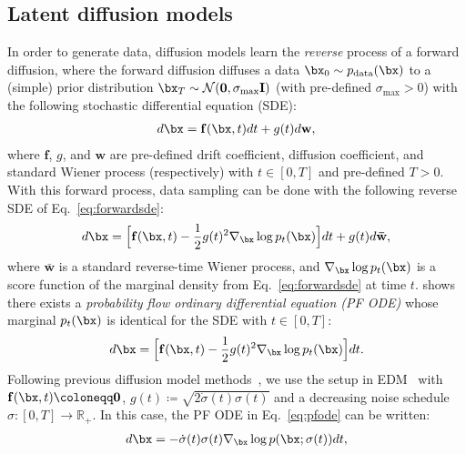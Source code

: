 \subsection{Latent diffusion models}
\label{subsec:ldm}
In order to generate data, 
diffusion models learn the \emph{reverse} process of a
forward diffusion, where the forward diffusion diffuses a data $\bx_{0} \sim p_{\text{data}}(\bx)$ to a (simple) prior distribution $\bx_{T} \sim \mathcal{N}(\mathbf{0}, \sigma_{\mathrm{max}} \mathbf{I})$ (with pre-defined $\sigma_{\mathrm{max}}>0$) with the following stochastic differential equation (SDE):
\begin{align}
    d\bx = \mathbf{f} (\bx, t) dt + g(t) d\mathbf{w},
    \label{eq:forwardsde}
\end{align}
where $\mathbf{f}$, $g$, and $\mathbf{w}$ are pre-defined drift coefficient, diffusion coefficient, and standard Wiener process (respectively) with $t \in [0, T]$ and pre-defined $T>0$. 
With this forward process, data sampling can be done with the following reverse SDE of Eq.~\eqref{eq:forwardsde}: 
\begin{align}
    d\bx = \Big[ \mathbf{f} (\bx, t) - \frac{1}{2} g(t)^2 \nabla_{\bx} \log p_t (\bx) \Big] dt + g(t) d\mathbf{\bar{w}},
\end{align}
where $\mathbf{\bar{w}}$ is a standard reverse-time Wiener process, and $\nabla_{\bx} \log p_t(\bx)$ is a score function of the marginal density from Eq.~\eqref{eq:forwardsde} at time $t$.
\citet{song2021scorebased} shows there exists a \emph{probability flow ordinary differential equation (PF ODE)}
whose marginal $p_t (\bx)$ is identical for the SDE with $t \in [0, T]$:
\begin{align}
    d\bx = \Big[ \mathbf{f} (\bx, t) - \frac{1}{2} g(t)^2 \nabla_{\bx} \log p_t (\bx) \Big] dt.
    \label{eq:pfode}
\end{align}
Following previous diffusion model methods~\citep{lee2024dreamflow,zheng2024fast}, we use the setup in EDM~\citep{karras2022edm} with $\mathbf{f} (\bx, t) \coloneqq \mathbf{0}$, $g(t)\coloneqq \sqrt{2\dot\sigma(t)\sigma(t)}$ and a decreasing noise schedule $\sigma: [0, T] \to \mathbb{R}_{+}$. In this case, the PF ODE in Eq.~\eqref{eq:pfode} can be written:
\begin{align}
    d\bx = -\dot\sigma(t)\sigma(t)\nabla_{\bx}\log p (\bx; \sigma(t)) dt,
\end{align}
